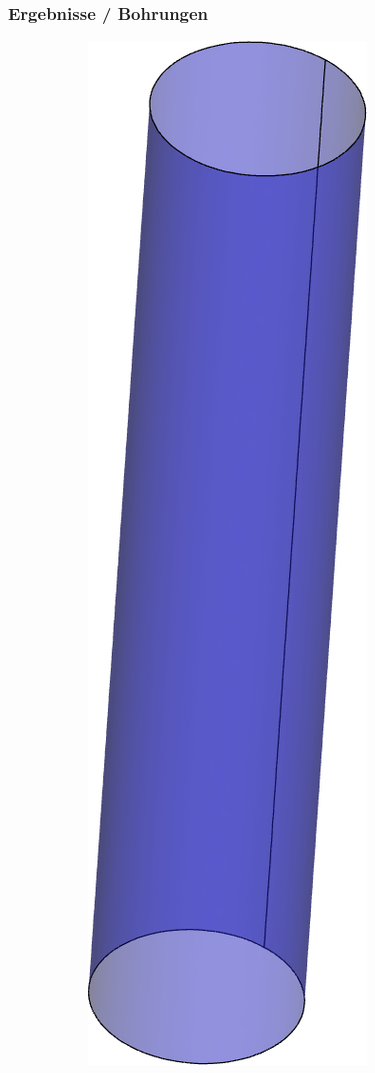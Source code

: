 \documentclass[8pt, aspectratio=169]{beamer}
\begin{document}
\begin{frame}
	\frametitle{Ergebnisse / Bohrungen}
	\vspace{-1cm}\hspace{2.5cm}
	\begin{figure}
		\centering
		\begin{subfigure}{.3\textwidth}
			\includegraphics[height=.7\textheight]{../tec/holes/16.png}

\end{subfigure}
\end{figure}
\end{frame}
\end{document}
